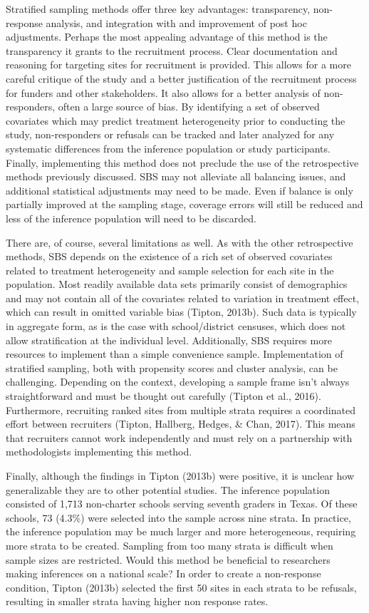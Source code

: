 \documentclass[man,floatsintext]{apa6}
\theoremstyle{definition}
\theoremstyle{definition}
\theoremstyle{definition}
\theoremstyle{remark}
\begin{document}
Stratified sampling methods offer three key advantages: transparency,
non-response analysis, and integration with and improvement of post hoc
adjustments. Perhaps the most appealing advantage of this method is the
transparency it grants to the recruitment process. Clear documentation
and reasoning for targeting sites for recruitment is provided. This
allows for a more careful critique of the study and a better
justification of the recruitment process for funders and other
stakeholders. It also allows for a better analysis of non-responders,
often a large source of bias. By identifying a set of observed
covariates which may predict treatment heterogeneity prior to conducting
the study, non-responders or refusals can be tracked and later analyzed
for any systematic differences from the inference population or study
participants. Finally, implementing this method does not preclude the
use of the retrospective methods previously discussed. SBS may not
alleviate all balancing issues, and additional statistical adjustments
may need to be made. Even if balance is only partially improved at the
sampling stage, coverage errors will still be reduced and less of the
inference population will need to be discarded.

There are, of course, several limitations as well. As with the other
retrospective methods, SBS depends on the existence of a rich set of
observed covariates related to treatment heterogeneity and sample
selection for each site in the population. Most readily available data
sets primarily consist of demographics and may not contain all of the
covariates related to variation in treatment effect, which can result in
omitted variable bias (Tipton, 2013b). Such data is typically in
aggregate form, as is the case with school/district censuses, which does
not allow stratification at the individual level. Additionally, SBS
requires more resources to implement than a simple convenience sample.
Implementation of stratified sampling, both with propensity scores and
cluster analysis, can be challenging. Depending on the context,
developing a sample frame isn't always straightforward and must be
thought out carefully (Tipton et al., 2016). Furthermore, recruiting
ranked sites from multiple strata requires a coordinated effort between
recruiters (Tipton, Hallberg, Hedges, \& Chan, 2017). This means that
recruiters cannot work independently and must rely on a partnership with
methodologists implementing this method.

Finally, although the findings in Tipton (2013b) were positive, it is
unclear how generalizable they are to other potential studies. The
inference population consisted of 1,713 non-charter schools serving
seventh graders in Texas. Of these schools, 73 (4.3\%) were selected
into the sample across nine strata. In practice, the inference
population may be much larger and more heterogeneous, requiring more
strata to be created. Sampling from too many strata is difficult when
sample sizes are restricted. Would this method be beneficial to
researchers making inferences on a national scale? In order to create a
non-response condition, Tipton (2013b) selected the first 50 sites in
each strata to be refusals, resulting in smaller strata having higher
non response rates.
\end{document}

